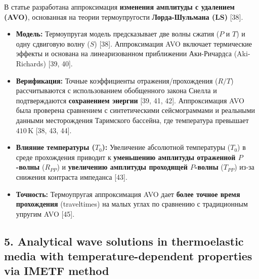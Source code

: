 \documentclass{article}
\begin{document}
В статье разработана аппроксимация \textbf{изменения амплитуды с удалением (AVO)}, основанная на теории термоупругости \textbf{Лорда-Шульмана (LS)} [38].
\begin{itemize}
    \item \textbf{Модель:} Термоупругая модель предсказывает две волны сжатия ($P$ и $T$) и одну сдвиговую волну ($S$) [38]. Аппроксимация AVO включает термические эффекты и основана на линеаризованном приближении Аки-Ричардса (Aki-Richards) [39, 40].
    \item \textbf{Верификация:} Точные коэффициенты отражения/прохождения ($R/T$) рассчитываются с использованием обобщенного закона Снелла и подтверждаются \textbf{сохранением энергии} [39, 41, 42]. Аппроксимация AVO была проверена сравнением с синтетическими сейсмограммами и реальными данными месторождения Таримского бассейна, где температура превышает $410 \, \text{K}$ [38, 43, 44].
    \item \textbf{Влияние температуры ($T_0$):} Увеличение абсолютной температуры ($T_0$) в среде прохождения приводит к \textbf{уменьшению амплитуды отраженной $P$-волны} ($R_{PP}$) и \textbf{увеличению амплитуды проходящей $P$-волны} ($T_{PP}$) из-за снижения контраста импеданса [43].
    \item \textbf{Точность:} Термоупругая аппроксимация AVO дает \textbf{более точное время прохождения} (traveltimes) на малых углах по сравнению с традиционным упругим AVO [45].
\end{itemize}

\subsection*{5. Analytical wave solutions in thermoelastic media with temperature-dependent properties via IMETF method}
\end{document}
